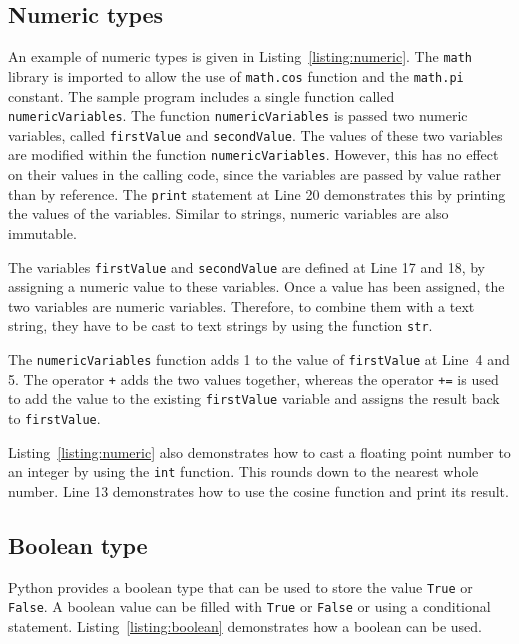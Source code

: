 \documentclass[11pt,a4paper]{article}
\begin{document}
\subsection{Numeric types}

An example of numeric types is given in Listing~\ref{listing:numeric}.  The \texttt{math} library is imported to allow the use of \texttt{math.cos} function and the \texttt{math.pi} constant.  The sample program includes a single function called \texttt{numericVariables}.  The function \texttt{numericVariables} is passed two numeric variables, called \texttt{firstValue} and \texttt{secondValue}.  The values of these two variables are modified within the function \texttt{numericVariables}.  However, this has no effect on their values in the calling code, since the variables are passed by value rather than by reference.  The \texttt{print} statement at Line 20 demonstrates this by printing the values of the variables.  Similar to strings, numeric variables are also immutable.



The variables \texttt{firstValue} and \texttt{secondValue} are defined at Line 17 and 18, by assigning a numeric value to these variables.  Once a value has been assigned, the two variables are numeric variables.  Therefore, to combine them with a text string, they have to be cast to text strings by using the function \texttt{str}.

The \texttt{numericVariables} function adds 1 to the value of \texttt{firstValue} at Line~4 and 5.  The operator \texttt{+} adds the two values together, whereas the operator \texttt{+=} is used to add the value to the existing \texttt{firstValue} variable and assigns the result back to \texttt{firstValue}.

Listing~\ref{listing:numeric} also demonstrates how to cast a floating point number to an integer by using the \texttt{int} function.  This rounds down to the nearest whole number.  Line 13 demonstrates how to use the cosine function and print its result.

\subsection{Boolean type}

Python provides a boolean type that can be used to store the value \texttt{True} or \texttt{False}.  A boolean value can be filled with \texttt{True} or \texttt{False} or using a conditional statement.  Listing~\ref{listing:boolean} demonstrates how a boolean can be used.
\end{document}

